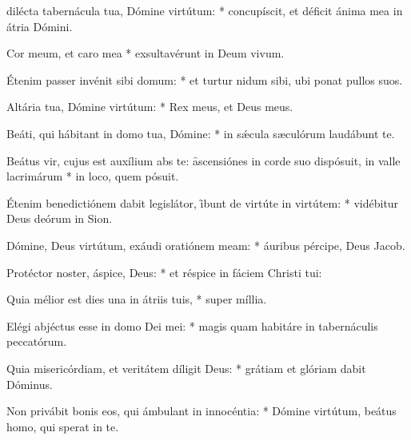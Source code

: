 \begin{psalmus}

     dilécta tabernácula tua, Dómine virtútum: * concupíscit, et déficit ánima mea in átria Dómini.

		Cor meum, et caro mea * exsultavérunt in Deum vivum.

		Étenim passer invénit sibi domum: * et turtur nidum sibi, ubi ponat pullos suos.

		Altária tua, Dómine virtútum: * Rex meus, et Deus meus.

		Beáti, qui hábitant in domo tua, Dómine: * in sǽcula sæculórum laudábunt te.

		Beátus vir, cujus est auxílium abs te: \f ascensiónes in corde suo dispósuit, in valle lacrimárum * in loco, quem pósuit.

		Étenim benedictiónem dabit legislátor, \f ibunt de virtúte in virtútem: * vidébitur Deus deórum in Sion.

		Dómine, Deus virtútum, exáudi oratiónem meam: * áuribus pércipe, Deus Jacob.

		Protéctor noster, áspice, Deus: * et réspice in fáciem Christi tui:

		Quia mélior est dies una in átriis tuis, * super míllia.

		Elégi abjéctus esse in domo Dei mei: * magis quam habitáre in tabernáculis peccatórum.

		Quia misericórdiam, et veritátem díligit Deus: * grátiam et glóriam dabit Dóminus.

		Non privábit bonis eos, qui ámbulant in innocéntia: * Dómine virtútum, beátus homo, qui sperat in te.

\end{psalmus}

